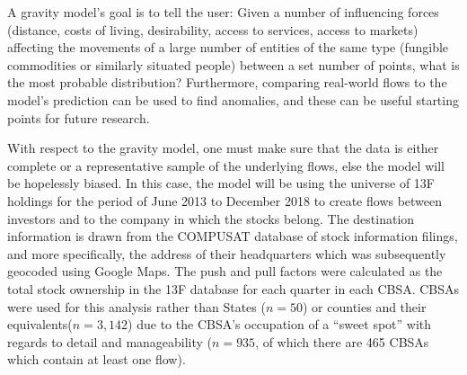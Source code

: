 A gravity model's goal is to tell the user: Given a number of influencing forces (distance, costs of living, desirability, access to services, access to markets) affecting the movements of a large number of entities of the same type (fungible commodities or similarly situated people) between a set number of points, what is the most probable distribution?  Furthermore, comparing real-world flows to the model's prediction can be used to find anomalies, and these can be useful starting points for future research\citep{Crymble19}.  

With respect to the gravity model, one must make sure that the data is either complete or a representative sample of the underlying flows, else the model will be hopelessly biased.  In this case, the model will be using the universe of 13F holdings for the period of June 2013 to December 2018 to create flows between investors and to the company in which the stocks belong.  The destination information is drawn from the COMPUSAT database \citep{Compustat} of stock information filings, and more specifically, the address of their headquarters which was subsequently geocoded using Google Maps.  The push and pull factors were calculated as the total stock ownership in the 13F database for each quarter in each CBSA.  CBSAs were used for this analysis rather than States ($n=50$) or counties and their equivalents($n=3,142$) due to the CBSA's occupation of a ``sweet spot'' with regards to detail and manageability  ($n= 935$, of which there are 465 CBSAs which contain at least one flow).  

